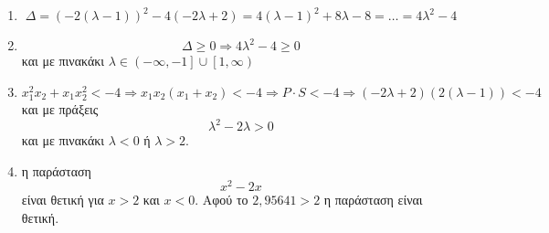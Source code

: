 \documentclass[12pt]{article}
\begin{document}
\part*{}

\begin{enumerate}
  \item $$Δ=(-2(λ-1))^2-4(-2λ+2)=4(λ-1)^2+8λ-8=\ldots=4λ^2-4$$
  \item $$Δ\ge 0 \Rightarrow 4λ^2-4\ge 0$$ και με πινακάκι $λ\in \left(-\infty,-1\right] \cup \left[1,\infty\right)$
  \item $$x_1^2x_2+x_1x_2^2<-4 \Rightarrow x_1x_2(x_1+x_2)<-4 \Rightarrow P\cdot S<-4 \Rightarrow (-2λ+2)(2(λ-1))<-4$$ και με πράξεις $$λ^2-2λ>0$$ και με πινακάκι $λ<0$ ή $λ>2$.
  \item η παράσταση $$x^2-2x$$ είναι θετική για $x>2$ και $x<0$. Αφού το $2,95641>2$ η παράσταση είναι θετική.
\end{enumerate}
\end{document}
